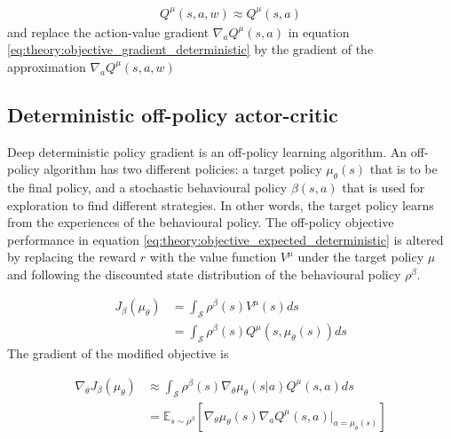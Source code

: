 \documentclass[class=book, crop=false]{standalone}
\begin{document}
\begin{equation}
   \begin{aligned}\label{eq:theory:action-value_approx}
    Q^{\mu}(s,a,w) \approx Q^{\mu}(s,a)
\end{aligned} 
\end{equation}
and replace the action-value gradient $\nabla_{a} Q^{\mu}(s,a)$ in equation \eqref{eq:theory:objective_gradient_deterministic} by
the gradient of the approximation $\nabla_{a} Q^{\mu}(s,a,w)$

\subsection{Deterministic off-policy actor-critic}
Deep deterministic policy gradient is an off-policy learning algorithm. An off-policy algorithm has two different policies: a target policy $\mu_{\theta}(s)$ that is to be the final policy, and a stochastic behavioural policy $\beta(s,a)$ that is used for exploration to find different strategies. In other words, the target policy learns from the experiences of the behavioural policy. The off-policy objective performance in equation \eqref{eq:theory:objective_expected_deterministic} is altered by replacing the reward $r$ with the value function $V^{\mu}$ under the target policy $\mu$ and following the discounted state distribution of the behavioural policy $\rho^{\beta}$.

\begin{equation}
   \begin{aligned}\label{eq:theory:objective_expected_ooff_policy}
    J_{\beta}(\mu_{\theta}) &=
    \int_{\mathcal{S}}
    \rho^{\beta}(s)V^{\mu}(s) ds 
    \\
    &=
    \int_{\mathcal{S}}
    \rho^{\beta}(s)Q^{\mu}(s,\mu_{\theta}(s)) ds
\end{aligned} 
\end{equation}
The gradient of the modified objective is

\begin{equation}
   \begin{aligned}\label{eq:theory:objective_gradient_deterministic_off_policy}
    \nabla_{\theta}J_{\beta}(\mu_{\theta}) &\approx
    \int_{\mathcal{S}}
    \rho^{\beta}(s)
    \nabla_{\theta} \mu_{\theta}(s|a)
    Q^{\mu}(s,a)ds 
    \\
    &= \mathbb{E}_{s\sim \rho^{\beta}}
    [\nabla_{\theta} \mu_{\theta}(s)
    \nabla_{a} Q^{\mu}(s,a)|_{a = \mu_{\theta}(s)}]
\end{aligned} 
\end{equation}
\end{document}
